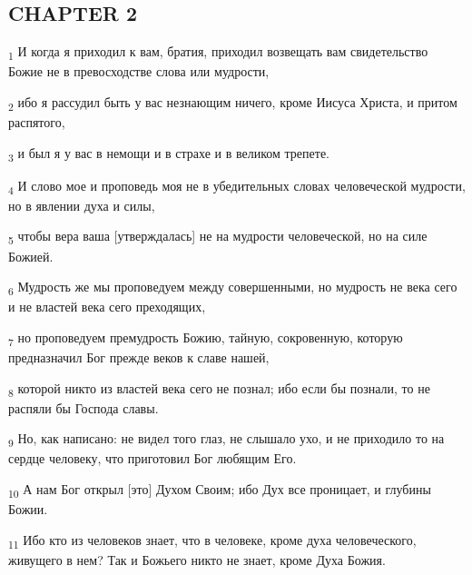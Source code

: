 \subsection{CHAPTER 2}
\begin{tcolorbox}
\textsubscript{1} И когда я приходил к вам, братия, приходил возвещать вам свидетельство Божие не в превосходстве слова или мудрости,
\end{tcolorbox}
\begin{tcolorbox}
\textsubscript{2} ибо я рассудил быть у вас незнающим ничего, кроме Иисуса Христа, и притом распятого,
\end{tcolorbox}
\begin{tcolorbox}
\textsubscript{3} и был я у вас в немощи и в страхе и в великом трепете.
\end{tcolorbox}
\begin{tcolorbox}
\textsubscript{4} И слово мое и проповедь моя не в убедительных словах человеческой мудрости, но в явлении духа и силы,
\end{tcolorbox}
\begin{tcolorbox}
\textsubscript{5} чтобы вера ваша [утверждалась] не на мудрости человеческой, но на силе Божией.
\end{tcolorbox}
\begin{tcolorbox}
\textsubscript{6} Мудрость же мы проповедуем между совершенными, но мудрость не века сего и не властей века сего преходящих,
\end{tcolorbox}
\begin{tcolorbox}
\textsubscript{7} но проповедуем премудрость Божию, тайную, сокровенную, которую предназначил Бог прежде веков к славе нашей,
\end{tcolorbox}
\begin{tcolorbox}
\textsubscript{8} которой никто из властей века сего не познал; ибо если бы познали, то не распяли бы Господа славы.
\end{tcolorbox}
\begin{tcolorbox}
\textsubscript{9} Но, как написано: не видел того глаз, не слышало ухо, и не приходило то на сердце человеку, что приготовил Бог любящим Его.
\end{tcolorbox}
\begin{tcolorbox}
\textsubscript{10} А нам Бог открыл [это] Духом Своим; ибо Дух все проницает, и глубины Божии.
\end{tcolorbox}
\begin{tcolorbox}
\textsubscript{11} Ибо кто из человеков знает, что в человеке, кроме духа человеческого, живущего в нем? Так и Божьего никто не знает, кроме Духа Божия.
\end{tcolorbox}
